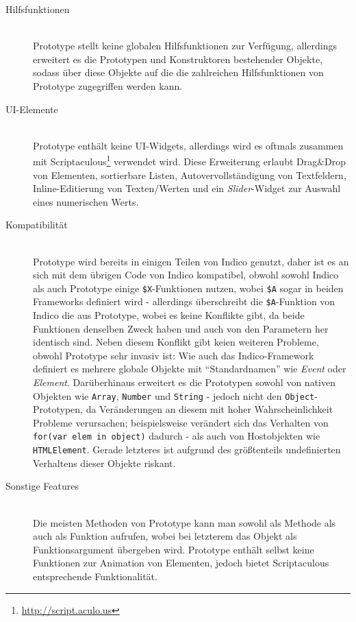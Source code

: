 \begin{description}
\item[Hilfsfunktionen] \hfill \\
Prototype stellt keine globalen Hilfsfunktionen zur Verfügung, allerdings erweitert es die
Prototypen und Konstruktoren bestehender Objekte, sodass über diese Objekte auf die die zahlreichen
Hilfsfunktionen von Prototype zugegriffen werden kann.

\item[UI-Elemente] \hfill \\
Prototype enthält keine UI-Widgets, allerdings wird es oftmals zusammen mit
Scriptaculous\footnote{\href{http://script.aculo.us}{http://script.aculo.us}} verwendet wird. Diese
Erweiterung erlaubt Drag\&Drop von Elementen, sortierbare Listen, Autovervollständigung von
Textfeldern, Inline-Editierung von Texten/Werten und ein \emph{Slider}-Widget zur Auswahl eines
numerischen Werts.

\item[Kompatibilität] \hfill \\
Prototype wird bereits in einigen Teilen von Indico genutzt, daher ist es an sich mit dem übrigen
Code von Indico kompatibel, obwohl sowohl Indico als auch Prototype einige
\lstinline{$X}-Funktionen nutzen, wobei \lstinline{$A} sogar in beiden Frameworks definiert wird -
allerdings überschreibt die \lstinline{$A}-Funktion von Indico die aus Prototype, wobei es keine
Konflikte gibt, da beide Funktionen denselben Zweck haben und auch von den Parametern her
identisch sind. Neben diesem Konflikt gibt keien weiteren Probleme, obwohl Prototype sehr invasiv
ist: Wie auch das Indico-Framework definiert es mehrere globale Objekte mit \enquote{Standardnamen}
wie \emph{Event} oder \emph{Element}. Darüberhinaus erweitert es die Prototypen sowohl von nativen
Objekten wie \lstinline{Array}, \lstinline{Number} und \lstinline{String} - jedoch nicht den
\lstinline{Object}-Prototypen, da Veränderungen an diesem mit hoher Wahrscheinlichkeit Probleme
verursachen; beispielsweise verändert sich das Verhalten von \lstinline{for(var elem in object)}
dadurch - als auch von Hostobjekten wie \lstinline{HTMLElement}. Gerade letzteres ist aufgrund des
größtenteils undefinierten Verhaltens dieser Objekte riskant.

\item[Sonstige Features] \hfill \\
Die meisten Methoden von Prototype kann man sowohl als Methode als auch als Funktion aufrufen, wobei
bei letzterem das Objekt als Funktionsargument übergeben wird. Prototype enthält selbst keine
Funktionen zur Animation von Elementen, jedoch bietet Scriptaculous entsprechende Funktionalität.


\end{description}
